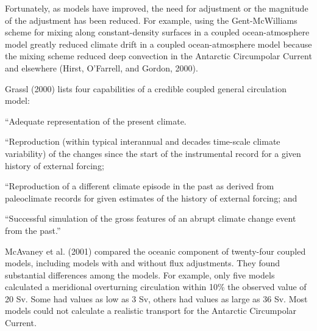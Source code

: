 Fortunately, as models have improved, the need for adjustment or the
magnitude of the adjustment has been reduced. For example, using the
Gent-McWilliams scheme for mixing along constant-density surfaces in a
coupled ocean-atmosphere model greatly reduced climate drift in a
coupled ocean-atmos\-phere model because the mixing scheme reduced deep convection in the Antarctic
Circumpolar Current and elsewhere (Hirst, O'Farrell, and Gordon, 2000).

Grassl (2000) lists four capabilities of a credible coupled general
circulation model:
\begin{enumerate}
\vitem ``Adequate representation of the present climate.

\vitem ``Reproduction (within typical interannual and decades
time-scale climate variability) of the changes since the start of the
instrumental record for a given history of external forcing;

\vitem ``Reproduction of a different climate episode in the past as
derived from paleoclimate records for given estimates of the history
of external forcing; and

\vitem ``Successful simulation of the gross features of an abrupt
climate change event from the past.''
\end{enumerate}

McAvaney et al. (2001) compared the oceanic component of twenty-four
coupled models, including models with and without flux
adjustments. They
found substantial differences among the models. For example, only five
models calculated a meridional overturning
circulation within 10\% the
observed value of 20 Sv. Some had values as low as 3 Sv, others had values as
large as 36 Sv. Most models could not calculate a realistic
transport for the
Antarctic Circumpolar Current.

